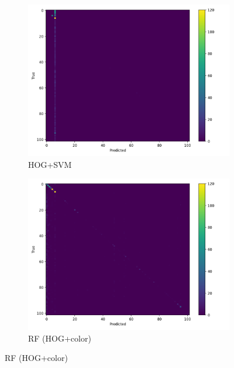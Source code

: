 \documentclass[11pt]{article}
\begin{document}
\begin{figure}[H]
  \centering

  \begin{subfigure}[t]{0.32\textwidth}
    \includegraphics[width=\linewidth]{results/hog_svm_rbf/confusion_matrix.png}
    \caption{HOG+SVM}\label{fig:cms-hog}
  \end{subfigure}\hfill
  \begin{subfigure}[t]{0.32\textwidth}
    \includegraphics[width=\linewidth]{results/rf_hog_color_128px/confusion_matrix.png}
    \caption{RF (HOG+color)}\label{fig:cms-rf}
  \end{subfigure}


\end{figure}
\end{document}
